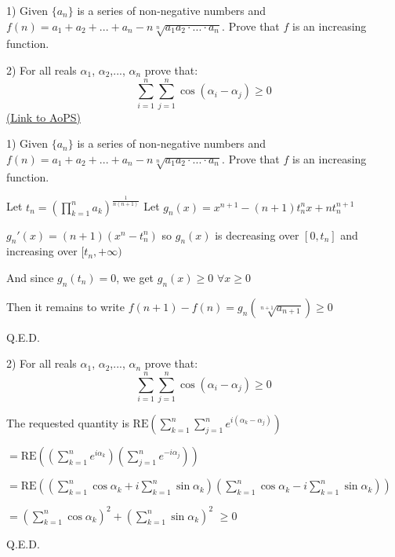 \begin{problem}
	1) Given $\{a_n\}$ is a series of non-negative numbers and $f(n)=a_1+a_2+...+a_n-n\sqrt[n]{a_1a_2\cdot...\cdot a_n}$.
Prove that $f$ is an increasing function.

2)  For all reals $\alpha_1$, $\alpha_2$,..., ${\alpha_n}$ prove that:
\[\sum_{i=1}^n\sum_{j=1}^n\cos\left(\alpha_i-\alpha_j\right)\geq0\]
	\flushright \href{https://artofproblemsolving.com/community/c6h572025}{(Link to AoPS)}
\end{problem}



\begin{solution}
	\begin{tcolorbox}1) Given $\{a_n\}$ is a series of non-negative numbers and $f(n)=a_1+a_2+...+a_n-n\sqrt[n]{a_1a_2\cdot...\cdot a_n}$.
Prove that $f$ is an increasing function.\end{tcolorbox}
Let $t_n=(\prod_{k=1}^na_k)^{\frac 1{n(n+1)}}$
Let $g_n(x)=x^{n+1}-(n+1)t_n^nx+nt_n^{n+1}$

$g_n'(x)=(n+1)(x^n-t_n^n)$ so $g_n(x)$ is decreasing over $[0,t_n]$ and increasing over $[t_n,+\infty)$

And since $g_n(t_n)=0$, we get $g_n(x)\ge 0$ $\forall x\ge 0$

Then it remains to write $f(n+1)-f(n)=g_n(\sqrt[n+1]{a_{n+1}})\ge 0$

Q.E.D.
\end{solution}



\begin{solution}
	\begin{tcolorbox}2)  For all reals $\alpha_1$, $\alpha_2$,..., ${\alpha_n}$ prove that:
\[\sum_{i=1}^n\sum_{j=1}^n\cos\left(\alpha_i-\alpha_j\right)\geq0\]\end{tcolorbox}
The requested quantity is $\text{RE}\left(\sum_{k=1}^n\sum_{j=1}^ne^{i(\alpha_k-\alpha_j)}\right)$

$=\text{RE}\left(\left(\sum_{k=1}^ne^{i\alpha_k}\right)\left(\sum_{j=1}^ne^{-i\alpha_j}\right)\right)$

$=\text{RE}\left(\left(\sum_{k=1}^n\cos \alpha_k +i\sum_{k=1}^n\sin \alpha_k\right)\left(\sum_{k=1}^n\cos \alpha_k -i\sum_{k=1}^n\sin \alpha_k\right)\right)$

$=\left(\sum_{k=1}^n\cos \alpha_k\right)^2+\left(\sum_{k=1}^n\sin \alpha_k\right)^2$ $\ge 0$

Q.E.D.
\end{solution}



